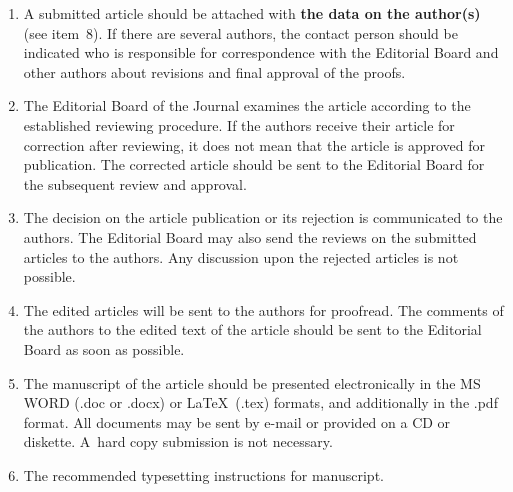{\begin{enumerate}[1.]
\textit{Author(s) signature(s): (name(s), address(es), date).}

This agreement should be submitted in paper form or in the form of a scanned copy (signed by
the authors).


\item
A submitted article should be attached with \textbf{the data on the author(s)} (see item~8). If
there are several authors, the contact person should be indicated who is responsible for
correspondence with the Editorial Board and other authors about revisions and final approval
of the proofs.\\[-13.5pt]

\item The Editorial Board of the Journal examines the article according to the established
reviewing procedure. If the authors receive their article for correction after reviewing, it does not
mean that the article is approved for publication. The corrected article should be sent to the
Editorial Board for the subsequent review and approval.\\[-13.5pt]

\item The decision on the article publication or its rejection is communicated to the authors. The
Editorial Board may also send the reviews on the submitted articles to the authors. Any
discussion upon the rejected articles is not possible.\\[-13.5pt]

\item The edited articles will be sent to the authors for proofread. The comments of the authors
to the edited text of the article should be sent to the Editorial Board as soon as possible.\\[-13.5pt]

\item The manuscript of the article should be presented electronically in the MS WORD (.doc or
.docx) or \LaTeX\ (.tex) formats, and additionally in the .pdf format. All documents
 may be sent
by e-mail or provided on a CD or diskette. A~hard copy submission is not necessary.\\[-13.5pt]

\item The recommended typesetting instructions for manuscript.


\end{enumerate}}
